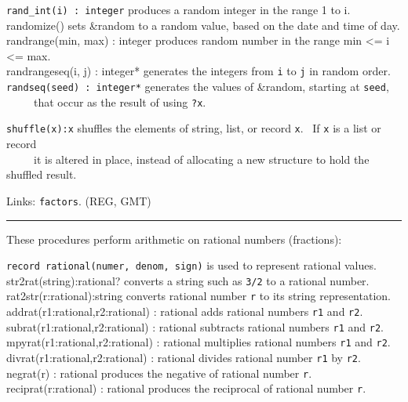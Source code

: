 \texttt{rand\_int(i) : integer} produces a random integer in the range 1
to i.\\
randomize() sets \&random to a
{\textquotedbl}random{\textquotedbl} value, based on the date and time
of day. \\
\textsf{randrange(min, max) : integer} produces random number in the
range \textsf{min {\textless}= i {\textless}= max}.\\
\textsf{randrangeseq(i, j) : integer*} generates the integers from
\texttt{i} to \texttt{j} in random order.\\
\texttt{randseq(seed) : integer*} generates the values of \&random,
starting at \texttt{seed},\\
 \ \ \ \ \ that occur as the result of using \texttt{?x}.

\texttt{shuffle(x):x} shuffles the elements of string, list, or record
\texttt{x}. \ If \texttt{x} is a list or record\\
 \ \ \ \ \ it is altered in place, instead of allocating a new structure
to hold the shuffled result.

Links: \texttt{factors}. (REG, GMT)

\vspace{0.25cm}\hrule{}

These procedures perform arithmetic on rational
numbers (fractions):

\texttt{record rational(numer, denom, sign)} is used to represent
rational values.\\
\textsf{str2rat(string):rational?} converts a string such as
\texttt{{\textquotedbl}3/2{\textquotedbl}} to a rational
number.\\
\textsf{rat2str(r:rational):string} converts rational number \texttt{r}
to its string representation.\\
\textsf{addrat(r1:rational,r2:rational) : rational} adds rational
numbers \texttt{r1} and \texttt{r2}.\\
\textsf{subrat(r1:rational,r2:rational) : rational} subtracts rational
numbers \texttt{r1} and \texttt{r2}.\\
\textsf{mpyrat(r1:rational,r2:rational) : rational} multiplies rational
numbers \texttt{r1} and \texttt{r2}.\\
\textsf{divrat(r1:rational,r2:rational) : rational} divides rational
number \texttt{r1} by \texttt{r2}.\\
\textsf{negrat(r) : rational} produces the negative of rational number
\texttt{r}.\\
\textsf{reciprat(r:rational) : rational} produces the reciprocal of
rational number \texttt{r}.

